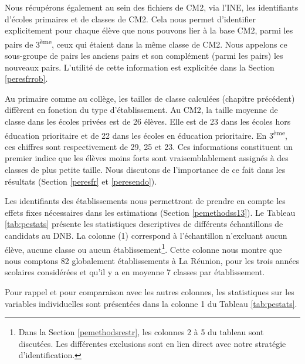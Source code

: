 \documentclass[
]{book}
\begin{document}
\quad Nous récupérons également au sein des fichiers de CM2, via l'INE, les identifiants d'écoles primaires et de classes de CM2. Cela nous permet d'identifier explicitement pour chaque élève que nous pouvons lier à la base CM2, parmi les pairs de 3\textsuperscript{ème}, ceux qui étaient dans la même classe de CM2. Nous appelons ce sous-groupe de pairs les anciens pairs et son complément (parmi les pairs) les nouveaux pairs. L'utilité de cette information est explicitée dans la Section \ref{peresfrrob}.

\quad Au primaire comme au collège, les tailles de classe calculées (chapitre précédent) diffèrent en fonction du type d'établissement.
Au CM2, la taille moyenne de classe dans les écoles privées est de 26 élèves. Elle est de 23 dans les écoles hors éducation prioritaire et de 22 dans les écoles en éducation prioritaire. En 3\textsuperscript{ème}, ces chiffres sont respectivement de 29, 25 et 23. Ces informations constituent un premier indice que les élèves moins forts sont vraisemblablement assignés à des classes de plus petite taille. Nous discutons de l'importance de ce fait dans les résultats (Section \ref{peresfr} et \ref{peresendo}).

\quad Les identifiants des établissements nous permettront de prendre en compte les effets fixes nécessaires dans les estimations (Section \ref{pemethodss13}). Le Tableau \ref{tab:pestats} présente les statistiques descriptives de différents échantillons de candidats au DNB. La colonne (1) correspond à l'échantillon n'excluant aucun élève, aucune classe ou aucun établissement\footnote{Dans la Section \ref{pemethodsrestr}, les colonnes 2 à 5 du tableau sont discutées. Les différentes exclusions sont en lien direct avec notre stratégie d'identification.}. Cette colonne nous montre que nous comptons 82 globalement établissements à La Réunion, pour les trois années scolaires considérées et qu'il y a en moyenne 7 classes par établissement.

\quad Pour rappel et pour comparaison avec les autres colonnes, les statistiques sur les variables individuelles sont présentées dans la colonne 1 du Tableau \ref{tab:pestats}.
\end{document}
